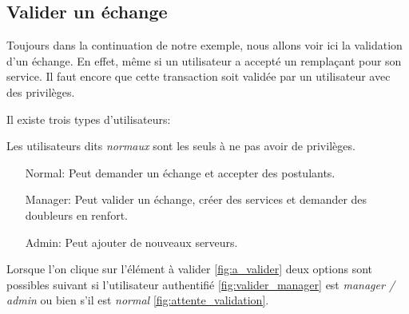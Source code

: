     \subsection*{Valider un échange}
    Toujours dans la continuation de notre exemple, nous allons voir ici 
    la validation d'un échange. En effet, même si un utilisateur
    a accepté un remplaçant pour son service. Il faut encore que cette
    transaction soit validée par un utilisateur avec des privilèges.

    Il existe trois types d'utilisateurs:
    \begin{center}
    \end{center}

    Les utilisateurs dits \textit{normaux} sont les seuls à ne pas avoir de privilèges.

    \begin{itemize}
        \item [Normal:] Peut demander un échange et accepter des postulants.
        \item [Manager:] Peut valider un échange, créer des services et demander des doubleurs en renfort.
        \item [Admin:] Peut ajouter de nouveaux serveurs. 
    \end{itemize}
    
    Lorsque l'on clique sur l'élément à valider \ref{fig:a_valider} deux options
    sont possibles suivant si l'utilisateur authentifié \ref{fig:valider_manager} est \textit{manager / admin} ou bien 
    s'il est \textit{normal} \ref{fig:attente_validation}.

